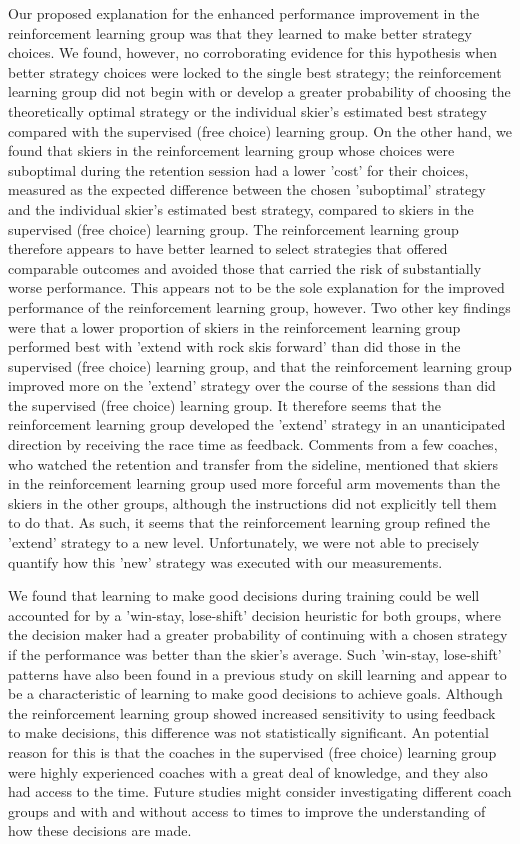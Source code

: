 \documentclass[pdflatex,sn-mathphys-num]{sn-jnl}%
\theoremstyle{thmstyleone}%
\theoremstyle{thmstyletwo}%
\theoremstyle{thmstylethree}%
\begin{document}
Our proposed explanation for the enhanced performance improvement in the reinforcement learning group was that they learned to make better strategy choices. We found, however, no corroborating evidence for this hypothesis when better strategy choices were locked to the single best strategy; the reinforcement learning group did not begin with or develop a greater probability of choosing the theoretically optimal strategy or the individual skier's estimated best strategy compared with the supervised (free choice) learning group. On the other hand, we found that skiers in the reinforcement learning group whose choices were suboptimal during the retention session had a lower 'cost' for their choices, measured as the expected difference between the chosen 'suboptimal' strategy and the individual skier's estimated best strategy, compared to skiers in the supervised (free choice) learning group. The reinforcement learning group therefore appears to have better learned to select strategies that offered comparable outcomes and avoided those that carried the risk of substantially worse performance. This appears not to be the sole explanation for the improved performance of the reinforcement learning group, however. Two other key findings were that a lower proportion of skiers in the reinforcement learning group performed best with 'extend with rock skis forward' than did those in the supervised (free choice) learning group, and that the reinforcement learning group improved more on the 'extend' strategy over the course of the sessions than did the supervised (free choice) learning group. It therefore seems that the reinforcement learning group developed the 'extend' strategy in an unanticipated direction by receiving the race time as feedback. Comments from a few coaches, who watched the retention and transfer from the sideline, mentioned that skiers in the reinforcement learning group used more forceful arm movements than the skiers in the other groups, although the instructions did not explicitly tell them to do that. As such, it seems that the reinforcement learning group refined the 'extend' strategy to a new level. Unfortunately, we were not able to precisely quantify how this 'new' strategy was executed with our measurements.

We found that learning to make good decisions during training could be well accounted for by a 'win-stay, lose-shift' decision heuristic for both groups, where the decision maker had a greater probability of continuing with a chosen strategy if the performance was better than the skier's average. Such 'win-stay, lose-shift' patterns have also been found in a previous study on skill learning \cite{jordan_a_taylor_explicit_2014} and appear to be a characteristic of learning to make good decisions to achieve goals. Although the reinforcement learning group showed increased sensitivity to using feedback to make decisions, this difference was not statistically significant. An potential reason for this is that the coaches in the supervised (free choice) learning group were highly experienced coaches with a great deal of knowledge, and they also had access to the time. Future studies might consider investigating different coach groups and with and without access to times to improve the understanding of how these decisions are made.
\end{document}
